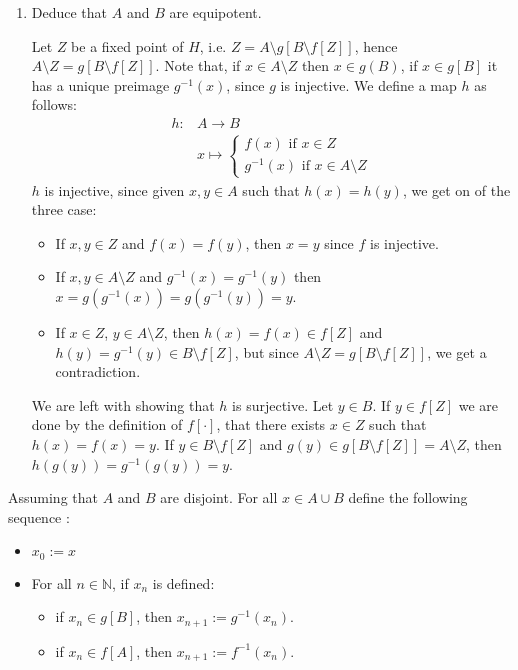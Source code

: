 \documentclass[a4paper,11pt]{exam}
\newcommand{\N}{\mathbb{N}}
\begin{document}
\begin{questions}
\begin{enumerate}
\begin{solution}
			\end{solution}
			
			\item Deduce that  $A$ and $B$ are equipotent.
			
			\begin{solution}
				Let $Z$ be a fixed point of $H$, i.e. $Z = A \setminus g[B \setminus f[Z]]$, hence $A \setminus Z = g[B \setminus f[Z]]$.
				Note that, if $x\in A\setminus Z$ then $x\in g(B)$, if $x \in g[B]$ it has a unique preimage $g^{-1}(x)$, since $g$ is injective.				
				We define a map $h$ as follows:
				\begin{align*}
				h : & A \to B\\
				& x \mapsto
				\begin{cases}
				f(x) \mbox{ if }x \in Z\\
				g^{-1}(x) \mbox{ if } x \in A \setminus Z
				\end{cases}
				\end{align*}
				$h$ is injective, since given $x,y \in A$ such that
				$h(x) = h(y)$, we get on of the three case:
				\begin{itemize}
					\item If $x,y \in Z$ and $f(x) = f(y)$, then $x = y$ since $f$ is injective.
					\item If $x,y \in A \setminus Z$ and $g^{-1}(x) = g^{-1}(y)$ then 
					$x = g(g^{-1}(x)) = g(g^{-1}(y)) = y$.
					\item If $x \in Z$, $y \in A \setminus Z$, then
					$h(x) = f(x) \in f[Z]$ and $h(y) = g^{-1}(y) \in B \setminus f[Z]$, but since $A \setminus Z = g[B \setminus f[Z]]$, we get a contradiction.
				\end{itemize}
				We are left with showing that $h$ is surjective. Let $y \in B$. If $y \in f[Z]$ we are done by the definition of $f[\cdot]$, that there exists $x \in Z$ such that
				$h(x) = f(x) = y$.
				If $y \in B \setminus f[Z]$ and $g(y) \in g[B \setminus f[Z]] = A\setminus Z$, then $h(g(y)) = g^{-1}(g(y)) = y$.
			\end{solution}
			
		\end{enumerate}
		
		\begin{solution}
			
			Assuming that $A$ and $B$ are disjoint.  For all $x\in A\cup B$ define the following sequence :
			\begin{itemize}
				\item $x_0 := x$
				\item For all $n \in \N$, if $x_{n}$ is defined:
				\begin{itemize}
					\item if  $x_n\in g[B]$, then $x_{n+1} := g^{-1}(x_{n})$.
					\item if $x_n\in f[A]$, then $x_{n+1} := f^{-1}(x_{n})$.
				\end{itemize}
			\end{itemize}
			

\end{solution}
\end{questions}
\end{document}
